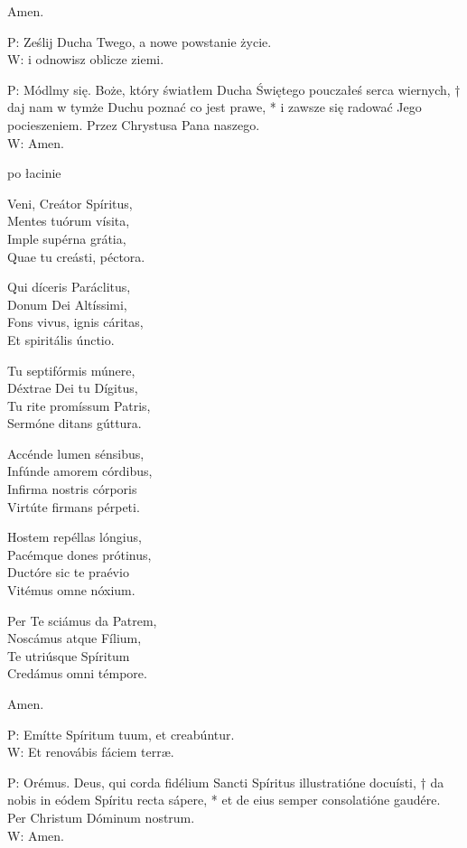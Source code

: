 ﻿\documentclass[9pt,twoside]{extarticle}
\begin{document}
Amen.


{\hnr P:} Ześlij Ducha Twego, a nowe powstanie życie.\\
{\hnr W:} i odnowisz oblicze ziemi.


{\hnr P:} Módlmy się. Boże, który światłem Ducha Świętego pouczałeś serca wiernych, † daj nam w tymże Duchu poznać co jest prawe, * i zawsze się radować Jego pocieszeniem. Przez Chrystusa Pana naszego.\\
{\hnr W:} Amen.


{\hnr po łacinie}


Veni, Creátor Spíritus,\\
Mentes tuórum vísita,\\
Imple supérna grátia,\\
Quae tu creásti, péctora.


Qui díceris Paráclitus,\\
Donum Dei Altíssimi,\\
Fons vivus, ignis cáritas,\\
Et spiritális únctio.


Tu septifórmis múnere,\\
Déxtrae Dei tu Dígitus,\\
Tu rite promíssum Patris,\\
Sermóne ditans gúttura.


Accénde lumen sénsibus,\\
Infúnde amorem córdibus,\\
Infirma nostris córporis\\
Virtúte firmans pérpeti.


Hostem repéllas lóngius,\\
Pacémque dones prótinus,\\
Ductóre sic te praévio\\
Vitémus omne nóxium.


Per Te sciámus da Patrem,\\
Noscámus atque Fílium,\\
Te utriúsque Spíritum\\
Credámus omni témpore.


Amen.


{\hnr P:} Emítte Spíritum tuum, et creabúntur.\\
{\hnr W:} Et renovábis fáciem terræ.


{\hnr P:} Orémus. Deus, qui corda fidélium Sancti Spíritus illustratióne docuísti, † da nobis in eódem Spíritu recta sápere, * et de eius semper consolatióne gaudére. Per Christum Dóminum nostrum.\\
{\hnr W:} Amen.
\end{document}
